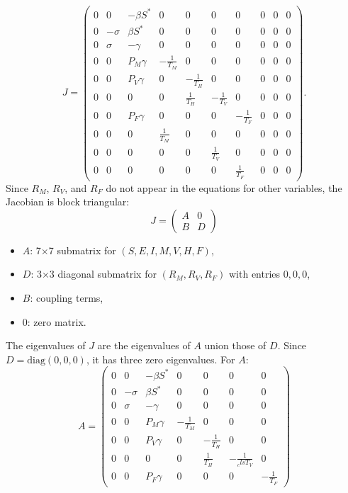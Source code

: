 \documentclass[11pt]{article}
\begin{document}
\[
J = \begin{pmatrix}
0 & 0 & -\beta S^* & 0 & 0 & 0 & 0 & 0 & 0 & 0 \\
0 & -\sigma & \beta S^* & 0 & 0 & 0 & 0 & 0 & 0 & 0 \\
0 & \sigma & -\gamma & 0 & 0 & 0 & 0 & 0 & 0 & 0 \\
0 & 0 & P_M \gamma & -\frac{1}{T_M} & 0 & 0 & 0 & 0 & 0 & 0 \\
0 & 0 & P_V \gamma & 0 & -\frac{1}{T_H} & 0 & 0 & 0 & 0 & 0 \\
0 & 0 & 0 & 0 & \frac{1}{T_H} & -\frac{1}{T_V} & 0 & 0 & 0 & 0 \\
0 & 0 & P_F \gamma & 0 & 0 & 0 & -\frac{1}{T_F} & 0 & 0 & 0 \\
0 & 0 & 0 & \frac{1}{T_M} & 0 & 0 & 0 & 0 & 0 & 0 \\
0 & 0 & 0 & 0 & 0 & \frac{1}{T_V} & 0 & 0 & 0 & 0 \\
0 & 0 & 0 & 0 & 0 & 0 & \frac{1}{T_F} & 0 & 0 & 0
\end{pmatrix}.
\]
Since $R_M$, $R_V$, and $R_F$ do not appear in the equations for other variables, the Jacobian is block triangular:
$$J = \begin{pmatrix}
A & 0 \\
B & D
\end{pmatrix}$$
\begin{itemize}
\item $A$: 7×7 submatrix for $(S, E, I, M, V, H, F)$,
\item $D$: 3×3 diagonal submatrix for $(R_M, R_V, R_F)$ with entries $0, 0, 0$,
\item $B$: coupling terms,
\item $0$: zero matrix.
\end{itemize}

The eigenvalues of $J$ are the eigenvalues of $A$ union those of $D$. Since $D = \text{diag}(0, 0, 0)$, it has three zero eigenvalues.
For $A$:
$$A = \begin{pmatrix}
0 & 0 & -\beta S^* & 0 & 0 & 0 & 0 \\
0 & -\sigma & \beta S^* & 0 & 0 & 0 & 0 \\
0 & \sigma & -\gamma & 0 & 0 & 0 & 0 \\
0 & 0 & P_M \gamma & -\frac{1}{T_M} & 0 & 0 & 0 \\
0 & 0 & P_V \gamma & 0 & -\frac{1}{T_H} & 0 & 0 \\
0 & 0 & 0 & 0 & \frac{1}{T_H} & -\frac{1}{_clsT_V} & 0 \\
0 & 0 & P_F \gamma & 0 & 0 & 0 & -\frac{1}{T_F}
\end{pmatrix}$$
\end{document}
